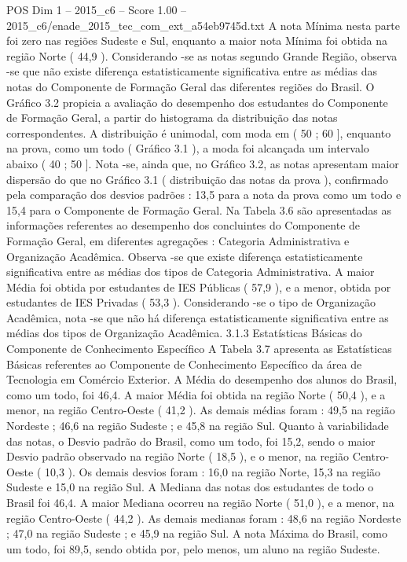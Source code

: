 \begin{textsample}{POS Dim 1 – 2015\_c6 – Score 1.00 – 2015\_c6/enade\_2015\_tec\_com\_ext\_a54eb9745d.txt}
A nota Mínima nesta parte foi zero nas regiões Sudeste e Sul, enquanto a maior nota Mínima foi obtida na região Norte ( 44,9 ).
Considerando -se as notas segundo Grande Região, observa -se que não existe diferença estatisticamente significativa entre as médias das notas do Componente de Formação Geral das diferentes regiões do Brasil.
O Gráfico 3.2 propicia a avaliação do desempenho dos estudantes do Componente de Formação Geral, a partir do histograma da distribuição das notas correspondentes.
A distribuição é unimodal, com moda em ( 50 ; 60 ], enquanto na prova, como um todo ( Gráfico 3.1 ), a moda foi alcançada um intervalo abaixo ( 40 ; 50 ].
Nota -se, ainda que, no Gráfico 3.2, as notas apresentam maior dispersão do que no Gráfico 3.1 ( distribuição das notas da prova ), confirmado pela comparação dos desvios padrões : 13,5 para a nota da prova como um todo e 15,4 para o Componente de Formação Geral.
Na Tabela 3.6 são apresentadas as informações referentes ao desempenho dos concluintes do Componente de Formação Geral, em diferentes agregações : Categoria Administrativa e Organização Acadêmica.
Observa -se que existe diferença estatisticamente significativa entre as médias dos tipos de Categoria Administrativa.
A maior Média foi obtida por estudantes de IES Públicas ( 57,9 ), e a menor, obtida por estudantes de IES Privadas ( 53,3 ).
Considerando -se o tipo de Organização Acadêmica, nota -se que não há diferença estatisticamente significativa entre as médias dos tipos de Organização Acadêmica. 3.1.3 Estatísticas Básicas do Componente de Conhecimento Específico A Tabela 3.7 apresenta as Estatísticas Básicas referentes ao Componente de Conhecimento Específico da área de Tecnologia em Comércio Exterior.
A Média do desempenho dos alunos do Brasil, como um todo, foi 46,4.
A maior Média foi obtida na região Norte ( 50,4 ), e a menor, na região Centro-Oeste ( 41,2 ).
As demais médias foram : 49,5 na região Nordeste ; 46,6 na região Sudeste ; e 45,8 na região Sul.
Quanto à variabilidade das notas, o Desvio padrão do Brasil, como um todo, foi 15,2, sendo o maior Desvio padrão observado na região Norte ( 18,5 ), e o menor, na região Centro-Oeste ( 10,3 ).
Os demais desvios foram : 16,0 na região Norte, 15,3 na região Sudeste e 15,0 na região Sul.
A Mediana das notas dos estudantes de todo o Brasil foi 46,4.
A maior Mediana ocorreu na região Norte ( 51,0 ), e a menor, na região Centro-Oeste ( 44,2 ).
As demais medianas foram : 48,6 na região Nordeste ; 47,0 na região Sudeste ; e 45,9 na região Sul.
A nota Máxima do Brasil, como um todo, foi 89,5, sendo obtida por, pelo menos, um aluno na região Sudeste.

\end{textsample}
